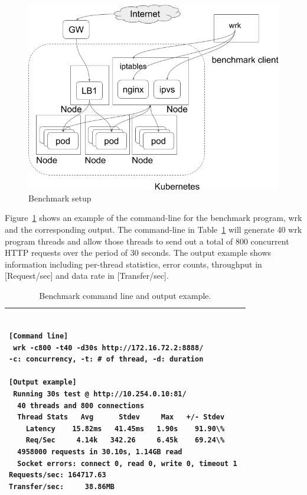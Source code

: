 \begin{figure}[h]
  \centering
  \includegraphics[width=0.9\columnwidth]{Figs/benchmark-schem}
  \caption[Benchmark setup]{Benchmark setup}
  \label{fig:benchmark-schem}
\end{figure}

Figure~\ref{fig:benchmark-schem} shows an example of the command-line for the benchmark program, wrk and the corresponding output.
The command-line in Table~\ref{tab:bench_example} will generate 40 wrk program threads
and allow those threads to send out a total of 800 concurrent HTTP requests over the period of 30 seconds.
The output example shows information including per-thread statistics, error counts, throughput in [Request/sec] and data rate in [Transfer/sec].

\begin{table}[h]
  \centering
  \begin{tabular}{l}
    \hline
    \begin{minipage}{0.7\columnwidth}
      \begin{verbatim}

[Command line] 
 wrk -c800 -t40 -d30s http://172.16.72.2:8888/ 
-c: concurrency, -t: # of thread, -d: duration 

[Output example] 
 Running 30s test @ http://10.254.0.10:81/ 
  40 threads and 800 connections 
  Thread Stats   Avg      Stdev     Max   +/- Stdev 
    Latency    15.82ms   41.45ms   1.90s    91.90\% 
    Req/Sec     4.14k   342.26     6.45k    69.24\% 
  4958000 requests in 30.10s, 1.14GB read 
  Socket errors: connect 0, read 0, write 0, timeout 1 
Requests/sec: 164717.63 
Transfer/sec:     38.86MB 
      \end{verbatim}
    \end{minipage}
    \\ \hline
  \end{tabular}
  \caption[Benchmark command line and output example]{Benchmark command line and output example.}
  \label{tab:bench_example}
\end{table}

